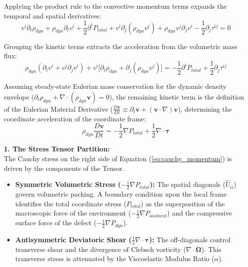 Applying the product rule to the convective momentum terms expands the temporal and spatial derivatives: 
\begin{equation}
    v^i \partial_t \rho_{dyn} + \rho_{dyn} \partial_t v^i + \frac{1}{2} \partial^i P_{total} + v^i \partial_j (\rho_{dyn} v^j) + \rho_{dyn} v^j \partial_j v^i - \frac{1}{2}\partial_j \tau^{ij} = 0 
\end{equation}

Grouping the kinetic terms extracts the acceleration from the volumetric mass flux: 
\begin{equation}
    \rho_{dyn} (\partial_t v^i + v^j \partial_j v^i) + v^i \big[ \partial_t \rho_{dyn} + \partial_j (\rho_{dyn} v^j) \big] = -\frac{1}{2}\partial^i P_{total} + \frac{1}{2}\partial_j \tau^{ij} 
\end{equation}

Assuming steady-state Eulerian mass conservation for the dynamic density envelope ($\partial_t \rho_{dyn} + \nabla \cdot (\rho_{dyn} \mathbf{v}) = 0$), the remaining kinetic term is the definition of the Eulerian Material Derivative ($\frac{D\mathbf{v}}{Dt} \equiv \partial_t \mathbf{v} + (\mathbf{v} \cdot \nabla)\mathbf{v}$), determining the coordinate acceleration of the coordinate frame: 
\begin{equation}
    \rho_{dyn} \frac{D\mathbf{v}}{Dt} = -\frac{1}{2}\nabla P_{total} + \frac{1}{2}\nabla \cdot \boldsymbol{\tau} \label{eq:cauchy_momentum} 
\end{equation}

\textbf{1. The Stress Tensor Partition:} \\ 
The Cauchy stress on the right side of Equation (\ref{eq:cauchy_momentum}) is driven by the components of the Tensor. 
\begin{itemize}
    \item \textbf{Symmetric Volumetric Stress ($-\frac{1}{2}\nabla P_{total}$):} The spatial diagonals ($\hat{U}_{ii}$) govern volumetric packing. A boundary condition upon the local frame identifies the total coordinate stress ($P_{total}$) as the superposition of the macroscopic force of the environment ($-\frac{1}{2}\nabla P_{ambient}$) and the compressive surface force of the defect ($-\frac{1}{2}\nabla P_{dyn}$). 
    \item \textbf{Antisymmetric Deviatoric Shear ($\frac{1}{2}\nabla \cdot \boldsymbol{\tau}$):} The off-diagonals control transverse shear and the divergence of Clebsch vorticity ($\nabla \cdot \boldsymbol{\Omega}$). This transverse stress is attenuated by the Viscoelastic Modulus Ratio ($\alpha$). 
\end{itemize}

